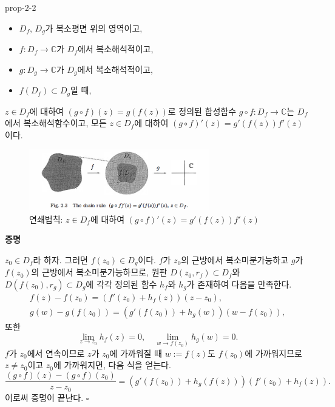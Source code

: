 \begin{saltprop}[연쇄법칙]{prop-2-2} %
\begin{itemize}
\item[(1)] $D_f$, $D_g$가 복소평면 위의 영역이고,
\item[(2)] $f:D_f \to \mathbb C$가 $D_f$에서 복소해석적이고,
\item[(3)] $g:D_g \to \mathbb C$가 $D_g$에서 복소해석적이고,
\item[(4)] $f(D_f) \subset D_g$일 때,
\end{itemize}
$z\in D_f$에 대하여 $(g\circ f)(z) = g(f(z))$로 정의된
합성함수 $g\circ f : D_f \to \mathbb C$는 $D_f$에서
복소해석함수이고, 
모든 $z\in D_f$에 대하여 $(g\circ f)'(z) = g'(f(z))f'(z)$이다.
\end{saltprop}

\begin{figure}[!h]
\begin{center}
\includegraphics[width=0.7\textwidth]{./SaltChapter/fig-2-3}
\end{center}
\caption{연쇄법칙: $z\in D_f$에 대하여 $(g\circ f)'(z) = g'(f(z))f'(z)$}
\label{fig-2-3}
\end{figure}

{\bf 증명}

$z_0\in D_f$라 하자. 그러면 $f(z_0)\in D_g$이다.
$f$가 $z_0$의 근방에서 복소미분가능하고
$g$가 $f(z_0)$의 근방에서 복소미분가능하므로,
원판 $D(z_0, r_f)\subset D_f$와 $D(f(z_0), r_g) \subset D_g$에 각각 정의된
함수 $h_f$와 $h_g$가 존재하여 다음을 만족한다.
\begin{gather*}
f(z) - f(z_0) = (f'(z_0)+h_f(z))(z-z_0), \\
g(w) - g(f(z_0)) = (g'(f(z_0)) + h_g(w))(w-f(z_0)),
\end{gather*}
또한
\[
\lim_{z\to z_0} h_f(z)=0, \quad
\lim_{w\to f(z_0)} h_g(w)=0.
\]
$f$가 $z_0$에서 연속이므로
$z$가 $z_0$에 가까워질 때 $w:=f(z)$도 $f(z_0)$에 가까워지므로
$z\ne z_0$이고 $z_0$에 가까워지면, 다음 식을 얻는다.
\[
\dfrac{(g\circ f)(z) - (g\circ f)(z_0)}{z-z_0} 
= (g'(f(z_0)) + h_g(f(z)))(f'(z_0) + h_f(z)).
\]
이로써 증명이 끝난다. \hfill $\square$


